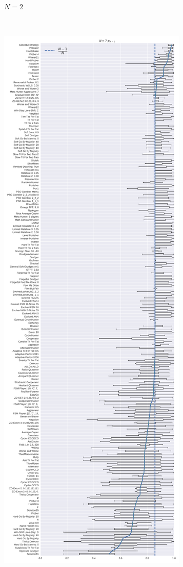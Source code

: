 \documentclass{article}
\begin{document}
\begin{figure}[!hbtp]
\begin{subfigure}[t]{.3\textwidth}
        \caption{\(N=2\)}
    \end{subfigure}%
    ~
    \begin{subfigure}[t]{.3\textwidth}
        \centering
        \includegraphics[width=\textwidth]{./img/boxplot_7_resist.pdf}

\end{subfigure}
\end{figure}
\end{document}
